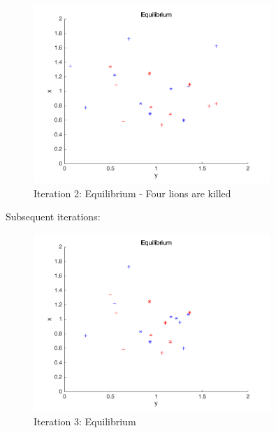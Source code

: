 \begin{figure}[H]
\begin{center}
\includegraphics[width=0.8\textwidth]{img/mdme/equilibrium2}
\caption{Iteration 2: Equilibrium - Four lions are killed}
\end{center}
\end{figure}

Subsequent iterations:
\begin{figure}[H]
\begin{center}
\includegraphics[width=0.8\textwidth]{img/mdme/equilibrium3}
\caption{Iteration 3: Equilibrium}
\end{center}
\end{figure}

